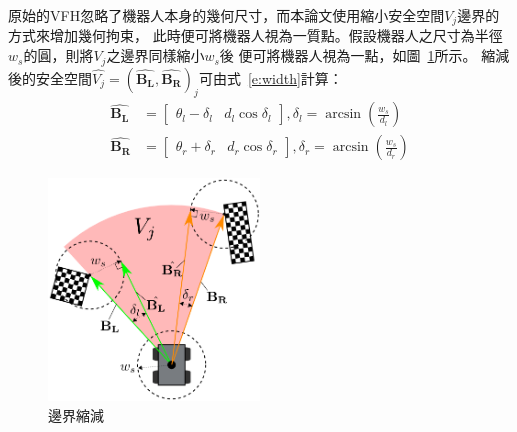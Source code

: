 原始的VFH忽略了機器人本身的幾何尺寸，而本論文使用縮小安全空間$V_j$邊界的方式來增加幾何拘束，
此時便可將機器人視為一質點。假設機器人之尺寸為半徑$w_s$的圓，則將$V_j$之邊界同樣縮小$w_s$後
便可將機器人視為一點，如圖~\ref{f:width}所示。
縮減後的安全空間$\hat{V_j} = (\hat{\mathbf{B_L}},\hat{\mathbf{B_R}})_j$可由式~\ref{e:width}計算：
\begin{align}
	\hat{\mathbf{B_L}}	&= \begin{bmatrix}
					\theta_l - \delta_l & d_l\cos\delta_l
				   \end{bmatrix},\delta_l = \arcsin({\frac{w_s}{d_l}}) \nonumber \\
	\hat{\mathbf{B_R}}	&= \begin{bmatrix}
					\theta_r + \delta_r & d_r\cos\delta_r
				   \end{bmatrix},\delta_r = \arcsin({\frac{w_s}{d_r}})
	\label{e:width}
\end{align}
\begin{figure}[h!]
	\centering
	\includegraphics[width=0.5\textwidth]{figures/algorithm/width}
	\caption{邊界縮減}
	\label{f:width}
\end{figure}

